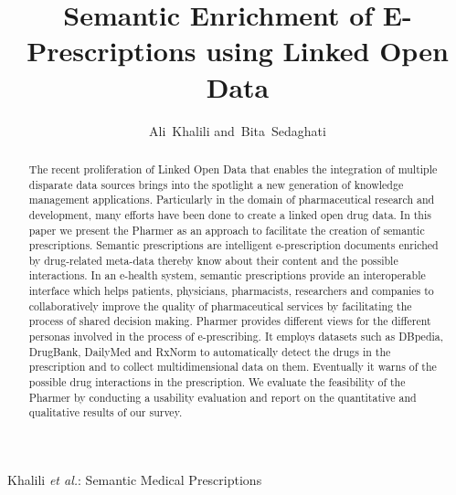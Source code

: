 \documentclass[journal]{IEEEtran}
\begin{document}
%
\title{Semantic Enrichment of E-Prescriptions using Linked Open Data}

\author{Ali~Khalili
        and~Bita~Sedaghati
}


%
{Khalili \MakeLowercase{\textit{et al.}}: Semantic Medical Prescriptions}
%

\maketitle


\begin{abstract}
The recent proliferation of Linked Open Data that enables the integration of multiple disparate data sources brings into the spotlight a new generation of knowledge management applications.
Particularly in the domain of pharmaceutical research and development, many efforts have been done to create a linked open drug data.
In this paper we present the Pharmer as an approach to facilitate the creation of semantic prescriptions.
Semantic prescriptions are intelligent e-prescription documents enriched by drug-related meta-data thereby know about their content and the possible interactions.
In an e-health system, semantic prescriptions provide an interoperable interface which helps patients, physicians, pharmacists, researchers and companies to collaboratively improve the quality of pharmaceutical services by facilitating the process of shared decision making.
Pharmer provides different views for the different personas involved in the process of e-prescribing.
It employs datasets such as DBpedia, DrugBank, DailyMed and RxNorm to automatically detect the drugs in the prescription and to collect multidimensional data on them.
Eventually it warns of the possible drug interactions in the prescription.
We evaluate the feasibility of the Pharmer by conducting a usability evaluation and report on the quantitative and qualitative results of our survey.
\end{abstract}
\end{document}
